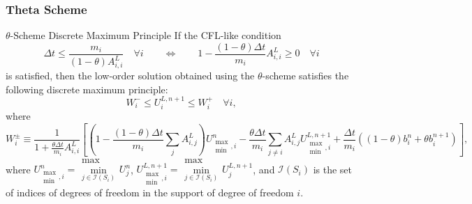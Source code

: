 \subsubsection{Theta Scheme}
\begin{theorem}{$\theta$-Scheme Discrete Maximum Principle}{}
If the CFL-like condition
\begin{equation}\label{theta_CFL}
   \Delta t \leq \frac{m_i}{(1-\theta)A_{i,i}^L}\quad\forall i
   \qquad\Longleftrightarrow\qquad
   1 - \frac{(1-\theta)\Delta t}{m_i}A_{i,i}^L \geq 0\quad\forall i
\end{equation}
is satisfied, then the low-order solution  obtained using the $\theta$-scheme
satisfies the following discrete maximum principle:
\begin{equation}\label{theta_max_principle}
   W_i^-\leq U_i^{L,n+1}\leq W_i^+\quad\forall i,
\end{equation}
where
\begin{equation}\label{theta_W}
   W_i^\pm \equiv \frac{1}{1+\frac{\theta\Delta t}{m_i}A_{i,i}^L}
     \left[\left(1 - \frac{(1-\theta)
     \Delta t}{m_i}\sum\limits_j A_{i,j}^L\right)U_{\substack{\max\\\min},i}^n
    -\frac{\theta\Delta t}{m_i}\sum\limits_{j\ne i}A_{i,j}^L
     U_{\substack{\max\\\min},i}^{L,n+1}
    +\frac{\Delta t}{m_i}\left((1-\theta)b_i^n + \theta b_i^{n+1}\right)\right],
\end{equation}
where $U_{\substack{\max\\\min},i}^n = \substack{\max\\\min\limits_{j\in
\mathcal{I}(S_i)}}U_j^n$,
$U_{\substack{\max\\\min},i}^{L,n+1} = \substack{\max\\\min\limits_{j\in
\mathcal{I}(S_i)}}U_j^{L,n+1}$,
and $\mathcal{I}(S_i)$ is the set of indices of degrees of freedom in the
support of degree of freedom $i$.
\end{theorem}
